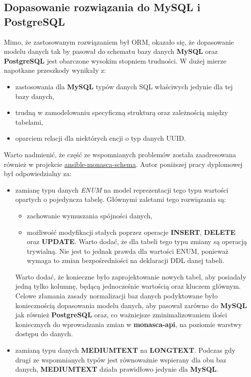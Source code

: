     \subsection{Dopasowanie rozwiązania do MySQL i PostgreSQL}
    Mimo, że zastosowanym rozwiązaniem był ORM, okazało się, że dopasowanie modelu danych tak by pasował do 
    schematu bazy danych \textbf{MySQL} oraz \textbf{PostgreSQL} jest obarczone wysokim stopniem trudności. 
    W dużej mierze napotkane przeszkody wynikały z:
    \begin{itemize}
        \item zastosowania dla \textbf{MySQL} typów danych SQL właściwych jedynie dla tej bazy danych,
        \item trudną w zamodelowaniu specyficzną strukturą oraz zależnością między tabelami,
        \item oparciem relacji dla niektórych encji o typ danych UUID.
    \end{itemize}
    
    Warto nadmienić, że część ze wspomnianych problemów została zaadresowana również
    w projekcie \href{https://github.com/FujitsuEnablingSoftwareTechnologyGmbH/ansible-monasca-schema}{ansible-monasca-schema}.
    Autor poniższej pracy dyplomowej był odpowiedzialny za:
    \begin{itemize}
        \item zamianę typu danych \textit{ENUM} na model reprezentacji tego typu wartości opartych
        o pojedyncza tabelę. Głównymi zaletami tego rozwiązania są:
        \begin{itemize}
            \item zachowanie wymuszania spójności danych,
            \item możliwość modyfikacji stałych poprzez operacje \textbf{INSERT}, \textbf{DELETE} oraz \textbf{UPDATE}. Warto
            dodać, że dla tabeli tego typu zmiany są operacją trywialną. Nie jest to jednak prawda dla wartości ENUM, ponieważ
            wymaga to zmian bezpośredniości na deklaracji DDL danej tabeli.
        \end{itemize}
        Warto dodać, że konieczne było zaprojektowanie nowych tabel, aby posiadały jedną tylko kolumnę, będącą jednocześnie
        wartością oraz kluczem głównym. Celowe złamania zasady normalizacji baz danych podyktowane było koniecznością
        dopasowania modelu danych, aby pasował zarówno do \textbf{MySQL} jak również \textbf{PostgreSQL} oraz, co ważniejsze
        zminimalizowaniem ilości koniecznych do wprowadzania zmian w \textbf{monasca-api}, na poziomie warstwy dostępu do danych.
        \item zamianą typu danych \textbf{MEDIUMTEXT} na \textbf{LONGTEXT}. Podczas gdy drugi ze wspomnianych typów jest równoważnie
        wspierany dla obu baz danych, \textbf{MEDIUMTEXT} działa prawidłowo jedynie dla \textbf{MySQL}.
    \end{itemize}
    
